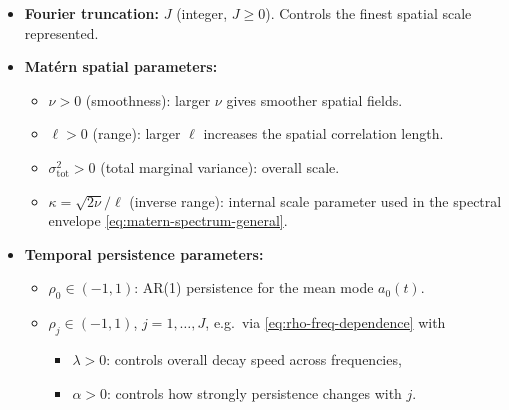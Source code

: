 \documentclass[answers,12pt,addpoints]{exam}
\begin{document}
\begin{itemize}
  \item \textbf{Fourier truncation:} $J$ (integer, $J\ge 0$). Controls the finest spatial scale represented.

  \item \textbf{Matérn spatial parameters:}
    \begin{itemize}
      \item $\nu > 0$ (smoothness): larger $\nu$ gives smoother spatial fields.
      \item $\ell > 0$ (range): larger $\ell$ increases the spatial correlation length.
      \item $\sigma^2_{\text{tot}} > 0$ (total marginal variance): overall scale.
      \item $\kappa = \sqrt{2\nu}/\ell$ (inverse range): internal scale parameter used in the spectral envelope \eqref{eq:matern-spectrum-general}.
    \end{itemize}

  \item \textbf{Temporal persistence parameters:}
    \begin{itemize}
      \item $\rho_0 \in (-1,1)$: AR(1) persistence for the mean mode $a_0(t)$.
      \item $\rho_j \in (-1,1)$, $j=1,\dots,J$, e.g.\ via \eqref{eq:rho-freq-dependence} with
        \begin{itemize}
          \item $\lambda > 0$: controls overall decay speed across frequencies,
          \item $\alpha > 0$: controls how strongly persistence changes with $j$.
        \end{itemize}
    \end{itemize}


\end{itemize}
\end{document}
